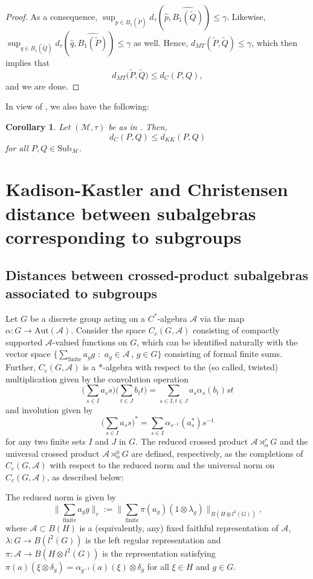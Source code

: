 \documentclass{amsart}
\numberwithin{equation}{section}
\newcommand{\Aut}{\mathrm{Aut}}
\newcommand{\1}{\mathbf{1}}
\newcommand{\mA}{\mathcal{A}}
\newcommand{\mM}{\mathcal{M}}
\newtheorem{cor}[theorem]{Corollary}
\begin{document}
\begin{proof}
As a consequence, \( \sup_{p\in B_1(\widetilde{P})}d_\tau \left(\widehat{p},
\widehat{B_1(\widetilde{Q})}\right)\leq \gamma.  \) Likewise, \(
\sup_{q\in B_1(\widetilde{Q})}d_\tau \left(\widehat{q},
\widehat{B_1(\widetilde{P})}\right)\leq \gamma \) as well.  Hence,
$d_{MT}(\widetilde{P}, \widetilde{Q})\leq \gamma$, which then implies that
\[
d_{MT}\big(\widetilde{P}, \widetilde{Q}\big) \leq d_C(P, Q),
\]
and we are done.
\end{proof}

In view of , we also have the following:
\begin{cor}\label{dC-dKK}
Let $(\mM, \tau)$ be as in . Then,   
$$
d_C(P, Q)\leq d_{KK}(P, Q)$$
for all
$P, Q \in \mathrm{Sub}_{\mM}$.
\end{cor}




\section{Kadison-Kastler and Christensen distance between subalgebras corresponding to subgroups}\label{calculations}

\subsection{Distances between crossed-product subalgebras associated to subgroups}
Let $G$ be a discrete group acting on a $C^*$-algebra $\mA$ via the
map $\alpha: G \rightarrow \Aut(\mA) $. Consider the space $C_{c}(G,
\mA)$ consisting of compactly supported $\mA$-valued functions on $G$,
which can be identified naturally with the vector space
$\{\sum_{\text{finite}}a_{g}g\,\,:\,\,a_{g}\in \mA\,,\,g\in G\}$
consisting of formal finite sums. Further, $C_{c}(G, \mA)$ is a
$*$-algebra with respect to the (so called, twisted) multiplication
given by the convolution operation
\[
\Big(\sum_{s\in I}a_{s}s\Big)\Big(\sum_{t\in J}b_{t}t\Big)= \sum_{s\in
  I, t\in J}a_{s}\alpha_{s}(b_{t})st
\]
and involution given by 
\[
\Big(\sum_{s\in I}a_{s}s\Big)^{*}= \sum_{s\in I}\alpha_{s^{-1}}(a_{s}^{*})s^{-1}
\]
for any two finite sets $I$ and $J$ in $G$. The reduced crossed
product $\mA \rtimes^r_{\alpha}G$ and the universal crossed product
$\mA \rtimes^u_{\alpha} G$ are defined, respectively, as the completions of
$C_{c}(G, \mA)$ with respect to the reduced norm and the universal norm
on $C_c(G, \mA)$, as described below:

The reduced norm is given by 
\[
\Big\|\sum_{\text{finite}}a_{g}g\Big\|_r:= \Big\|\sum_{\text{finite}}\pi(a_g)(1\otimes
\lambda_g)\Big\|_{B(H\otimes l^2(G))},
\]  
where $\mA \subset B(H) $ is a (equivalently, any) fixed faithful
representation of $\mA$, $\lambda: G\rightarrow B(l^2(G))$ is the left
regular representation and $\pi: \mA \rightarrow B(H\otimes l^2(G))$ is
the representation satisfying $\pi(a)(\xi \otimes \delta_g)=
\alpha_{g^{-1}}(a)(\xi)\otimes \delta_g$ for all $\xi \in H$ and $g\in
G$.
\end{document}
